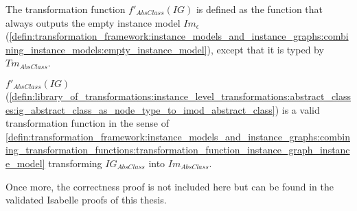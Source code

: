 \begin{defin}
\label{defin:library_of_transformations:instance_level_transformations:abstract_classes:ig_abstract_class_as_node_type_to_imod_abstract_class}
The transformation function $f'_{AbsClass}(IG)$ is defined as the function that always outputs the empty instance model $Im_\epsilon$ (\cref{defin:transformation_framework:instance_models_and_instance_graphs:combining_instance_models:empty_instance_model}), except that it is typed by $Tm_{AbsClass}$.
\end{defin}

\begin{thm}
\label{defin:library_of_transformations:instance_level_transformations:abstract_classes:ig_abstract_class_as_node_type_to_imod_abstract_class_func}
$f'_{AbsClass}(IG)$ (\cref{defin:library_of_transformations:instance_level_transformations:abstract_classes:ig_abstract_class_as_node_type_to_imod_abstract_class}) is a valid transformation function in the sense of \cref{defin:transformation_framework:instance_models_and_instance_graphs:combining_transformation_functions:transformation_function_instance_graph_instance_model} transforming $IG_{AbsClass}$ into $Im_{AbsClass}$.
\end{thm}

Once more, the correctness proof is not included here but can be found in the validated Isabelle proofs of this thesis.